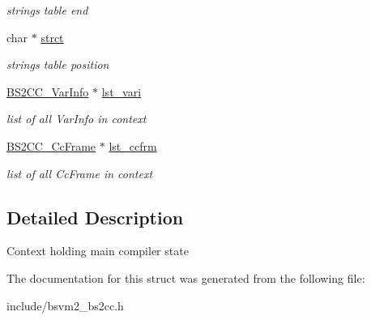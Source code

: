 \begin{DoxyCompactItemize}
\begin{DoxyCompactList}\small\item\em strings table end \end{DoxyCompactList}\item 
\hypertarget{structBS2CC__CompileContext__s_af00a3196911fc5afae7458cbbe69992e}{char $\ast$ \hyperlink{structBS2CC__CompileContext__s_af00a3196911fc5afae7458cbbe69992e}{strct}}\label{structBS2CC__CompileContext__s_af00a3196911fc5afae7458cbbe69992e}

\begin{DoxyCompactList}\small\item\em strings table position \end{DoxyCompactList}\item 
\hypertarget{structBS2CC__CompileContext__s_aeecfe70dc6b9c8a61c2f9acdf2023be7}{\hyperlink{structBS2CC__VarInfo__s}{B\-S2\-C\-C\-\_\-\-Var\-Info} $\ast$ \hyperlink{structBS2CC__CompileContext__s_aeecfe70dc6b9c8a61c2f9acdf2023be7}{lst\-\_\-vari}}\label{structBS2CC__CompileContext__s_aeecfe70dc6b9c8a61c2f9acdf2023be7}

\begin{DoxyCompactList}\small\item\em list of all Var\-Info in context \end{DoxyCompactList}\item 
\hypertarget{structBS2CC__CompileContext__s_a4c93348973a2f52c55506f9213d94fce}{\hyperlink{structBS2CC__CcFrame__s}{B\-S2\-C\-C\-\_\-\-Cc\-Frame} $\ast$ \hyperlink{structBS2CC__CompileContext__s_a4c93348973a2f52c55506f9213d94fce}{lst\-\_\-ccfrm}}\label{structBS2CC__CompileContext__s_a4c93348973a2f52c55506f9213d94fce}

\begin{DoxyCompactList}\small\item\em list of all Cc\-Frame in context \end{DoxyCompactList}\end{DoxyCompactItemize}


\subsection{Detailed Description}
Context holding main compiler state 

The documentation for this struct was generated from the following file\-:\begin{DoxyCompactItemize}
\item 
include/bsvm2\-\_\-bs2cc.\-h\end{DoxyCompactItemize}
